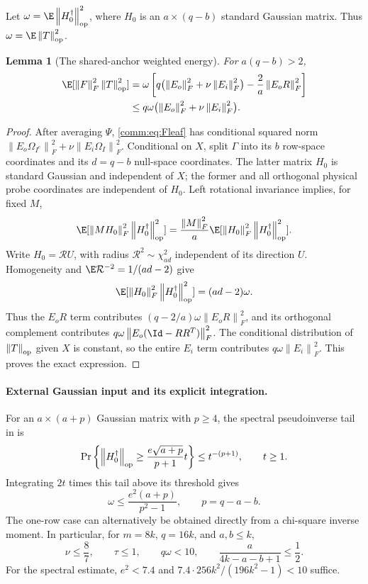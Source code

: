 \documentclass[11pt,oneside,openany,a4paper]{book}
\numberwithin{equation}{chapter}
\newtheorem{lemma}[theorem]{Lemma}
\theoremstyle{definition}
\theoremstyle{remark}
\newcommand{\F}[1]{\left\lVert#1\right\rVert_F}
\newcommand{\op}[1]{\left\lVert#1\right\rVert_{\rm op}}
\begin{document}
Let $\omega=\E\op{H_0^\dagger}^2$, where $H_0$ is an $a\times(q-b)$ standard Gaussian matrix. Thus $\omega=\E\op T^2$.
\begin{lemma}[The shared-anchor weighted energy]\label{comm:lem:weighted}
For $a(q-b)>2$,
\begin{equation}\label{comm:eq:weighted}
 \begin{split}
 \E[\F F^2\op T^2]
 &=\omega\left[q\bigl(\F{E_o}^2+\nu\F{E_i}^2\bigr)
                   -\frac2a\F{E_oR}^2\right]\\
 &\le q\omega\bigl(\F{E_o}^2+\nu\F{E_i}^2\bigr).
 \end{split}
\end{equation}
\end{lemma}
\begin{proof}
After averaging $\Psi$, \eqref{comm:eq:Fleaf} has conditional squared norm
$\F{E_o\Omega_{I^c}}^2+\nu\F{E_i\Omega_I}^2$.
Conditional on $X$, split $\Gamma$ into its $b$ row-space coordinates and its $d=q-b$ null-space coordinates. The latter matrix $H_0$ is standard Gaussian and independent of $X$; the former and all orthogonal physical probe coordinates are independent of $H_0$. Left rotational invariance implies, for fixed $M$,
\[
 \E[\F{MH_0}^2\op{H_0^\dagger}^2]
 =\frac{\F M^2}{a}\E[\F{H_0}^2\op{H_0^\dagger}^2].
\]
Write $H_0=\mathcal R U$, with radius $\mathcal R^2\sim\chi^2_{ad}$ independent of its direction $U$. Homogeneity and $\E\mathcal R^{-2}=1/(ad-2)$ give
\[
 \E[\F{H_0}^2\op{H_0^\dagger}^2]=(ad-2)\omega.
\]
Thus the $E_oR$ term contributes $(q-2/a)\omega\F{E_oR}^2$, and its orthogonal complement contributes $q\omega\F{E_o(\Id-RR^T)}^2$. The conditional distribution of $\op T$ given $X$ is constant, so the entire $E_i$ term contributes $q\omega\F{E_i}^2$. This proves the exact expression.
\end{proof}

\paragraph{External Gaussian input and its explicit integration.}
For an $a\times(a+p)$ Gaussian matrix with $p\ge4$, the spectral pseudoinverse tail in \cite[Sec.~10.1, Eq.~(71) in the arXiv HTML rendering]{HMT} is
\[
 \Pr\left\{\op{H_0^\dagger}\ge\frac{e\sqrt{a+p}}{p+1}t\right\}
 \le t^{-(p+1)},\qquad t\ge1.
\]
Integrating $2t$ times this tail above its threshold gives
\begin{equation}\label{comm:eq:omega}
 \omega\le\frac{e^2(a+p)}{p^2-1},\qquad p=q-a-b.
\end{equation}
The one-row case can alternatively be obtained directly from a chi-square inverse moment. In particular, for $m=8k$, $q=16k$, and $a,b\le k$,
\begin{equation}\label{comm:eq:constants}
 \nu\le\frac87,\qquad\tau\le1,\qquad q\omega<10,
 \qquad\frac{a}{4k-a-b+1}\le\frac12.
\end{equation}
For the spectral estimate, $e^2<7.4$ and
$7.4\cdot256k^2/(196k^2-1)<10$ suffice.
\end{document}
